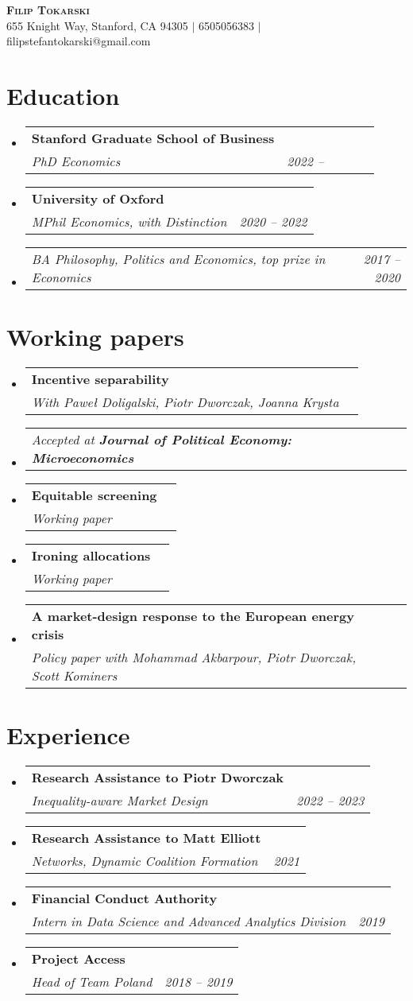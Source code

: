 \documentclass[letterpaper,11pt]{article}
\makeatletter
\newcommand{\resumeSubheading}[3]{
  \vspace{-2pt}\item
    \begin{tabular*}{0.97\textwidth}[t]{l@{\extracolsep{\fill}}r}
      \textbf{#1} \\
      \textit{\small#2} & \textit{\small #3} \\
    \end{tabular*}\vspace{-7pt}
}
\newcommand{\resumeSubSubheading}[2]{
    \item
    \begin{tabular*}{0.97\textwidth}{l@{\extracolsep{\fill}}r}
      \textit{\small#1} & \textit{\small #2} \\
    \end{tabular*}\vspace{-7pt}
}
\newcommand{\resumeSubHeadingListStart}{\begin{itemize}[leftmargin=0.15in, label={}]}
\newcommand{\resumeSubHeadingListEnd}{\end{itemize}}
\makeatother
\begin{document}
\begin{center}
    \textbf{\Huge \scshape Filip Tokarski} \\ \vspace{1pt}
    \small 655 Knight Way, Stanford, CA 94305 $|$
    \small 6505056383 $|$
    \small filipstefantokarski@gmail.com %
\end{center}



\section{Education}
  \resumeSubHeadingListStart
    \resumeSubheading
      {Stanford Graduate School of Business}
      {PhD Economics}{2022 -- \ \ \ \ \ \ }
    \resumeSubHeadingListEnd
  \resumeSubHeadingListStart
    \resumeSubheading
      {University of Oxford}
      {MPhil Economics, with Distinction}{2020 -- 2022}
        \resumeSubSubheading
      {BA Philosophy, Politics and Economics, top prize in Economics}{2017 -- 2020}
  \resumeSubHeadingListEnd

\bigskip

\section{Working papers}
  \resumeSubHeadingListStart
  \resumeSubheading
      {Incentive separability}
      {With Pawe\l{} Doligalski, Piotr Dworczak, Joanna Krysta}{}
      \resumeSubSubheading
      {Accepted at \textbf{Journal of Political Economy: Microeconomics}}{}
  \resumeSubheading
  {Equitable screening}
  {Working paper}{}
    \resumeSubheading
    {Ironing allocations}
    {Working paper}{}
    \resumeSubheading
      {A market-design response to the European energy crisis}
      {Policy paper with Mohammad Akbarpour, Piotr Dworczak, Scott Kominers}{}
  \resumeSubHeadingListEnd

\bigskip




\section{Experience}
  \resumeSubHeadingListStart
      \resumeSubheading
      {Research Assistance to Piotr Dworczak}
      {Inequality-aware Market Design}{2022 -- 2023}
     \resumeSubheading
      {Research Assistance to Matt Elliott}
      {Networks, Dynamic Coalition Formation}{2021}
    \resumeSubheading
      {Financial Conduct Authority}
      {Intern in Data Science and Advanced Analytics Division}{2019}
    \resumeSubheading
      {Project Access}
      {Head of Team Poland}{2018 -- 2019}
  \resumeSubHeadingListEnd
\end{document}
